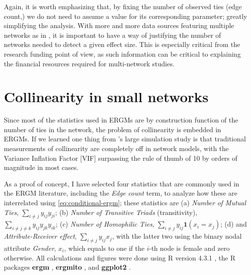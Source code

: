 \documentclass[12pt]{article}
\begin{document}
Again, it is worth emphasizing that, by fixing the number of observed ties (edge count,) we do not need to assume a value for its corresponding parameter; greatly simplifying the analysis. With more and more data sources featuring multiple networks as in \cite{krivitskyTaleTwoDatasets2022}, it is important to have a way of justifying the number of networks needed to detect a given effect size. This is especially critical from the research funding point of view, as such information can be critical to explaining the financial resources required for multi-network studies.

\section{Collinearity in small networks}

Since most of the statistics used in ERGMs are by construction function of the number of ties in the network, the problem of collinearity is embedded in ERGMs. If we learned one thing from \cite*{duxburyDiagnosingMulticollinearityExponential2021}'s large simulation study is that traditional measurements of collinearity are completely off in network models, with the Variance Inflation Factor [VIF] surpassing the rule of thumb of 10 by orders of magnitude in most cases.

As a proof of concept, I have selected four statistics that are commonly used in the ERGM literature, including the \textit{Edge count} term, to analyze how these are interrelated using \eqref{eq:conditional-ergm}; these statistics are (a) \textit{Number of Mutual Ties}, $\sum_{i\neq j}y_{ij}y_{ji}$; (b) \textit{Number of Transitive Triads} (transitivity), $\sum_{i\neq j\neq k}y_{ij}y_{jk}y_{ik}$; (c) \textit{Number of Homophilic Ties}, $\sum_{i\neq j}y_{ij}\mathbf{1}\left(x_i=x_j\right)$; (d) and \textit{Attribute-Receiver effect}, $\sum_{i\neq j}y_{ij}x_j$, with the latter two using the binary nodal attribute \textit{Gender}, $x_i$, which equals to one if the $i$-th node is female and zero otherwise. All calculations and figures were done using R version 4.3.1 \citep{R}, the R packages \textbf{ergm} \citep{hunterErgmPackageFit2008,handcockErgmFitSimulate2023,krivitskyErgm4NewFeatures2023}, \textbf{ergmito} \citep{ergmito,yonExponentialRandomGraph2021}, and \textbf{ggplot2} \citep{ggplot2}.

\bigskip
\end{document}

